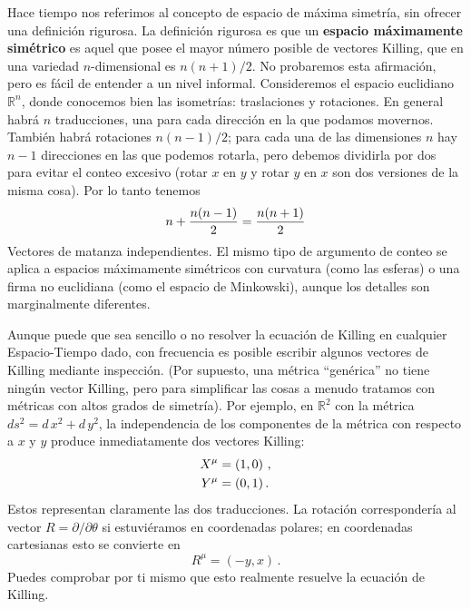\documentclass[11pt,b5paper,openany,twoside]{book}
\newcommand{\R}{\mathbb{R}}
\begin{document}
Hace tiempo nos referimos al concepto de espacio de máxima simetría, sin ofrecer una definición rigurosa.
La definición rigurosa es que un {\bf espacio máximamente simétrico} es aquel que posee el mayor número posible de vectores Killing, que en una variedad $n$-dimensional es $n(n+1)/2$.
No probaremos esta afirmación, pero es fácil de entender a un nivel informal.
Consideremos el espacio euclidiano $\R^n$, donde conocemos bien las isometrías: traslaciones y rotaciones.
En general habrá $n$ traducciones, una para cada dirección en la que podamos movernos.
También habrá rotaciones $n(n-1)/2$; para cada una de las dimensiones $n$ hay $n-1$ direcciones en las que podemos rotarla, pero debemos dividirla por dos para evitar el conteo excesivo (rotar $x$ en $y$ y rotar $y$ en $x$ son dos versiones de la misma cosa).
Por lo tanto tenemos
\begin{equation}
n+{{n(n-1)}\over 2}= {{n(n+1)}\over2} \label{5.44}
\end{equation}
Vectores de matanza independientes.
El mismo tipo de argumento de conteo se aplica a espacios máximamente simétricos con curvatura (como las esferas) o una firma no euclidiana (como el espacio de Minkowski), aunque los detalles son marginalmente diferentes.

Aunque puede que sea sencillo o no resolver la ecuación de Killing en cualquier Espacio-Tiempo dado, con frecuencia es posible escribir algunos vectores de Killing mediante inspección.
(Por supuesto, una métrica ``genérica'' no tiene ningún vector Killing, pero para simplificar las cosas a menudo tratamos con métricas con altos grados de simetría).
Por ejemplo, en $\R^2$ con la métrica $ds^2 =  d\,x^2+ d\,y^2$, la independencia de los componentes de la métrica con respecto a $x$ y $y$ produce inmediatamente dos vectores Killing:
\begin{align}
X^\mu &=  (1,0)\ , \notag \\
Y^\mu &=  (0,1)\,.\label{5.45}
\end{align}
Estos representan claramente las dos traducciones.
La rotación correspondería al vector $R=\partial/\partial\theta$ si estuviéramos en coordenadas polares; en coordenadas cartesianas esto se convierte en
\begin{equation}
R^\mu = (-y,x)\,.\label{5.46}
\end{equation}
Puedes comprobar por ti mismo que esto realmente resuelve la ecuación de Killing.
\end{document}
